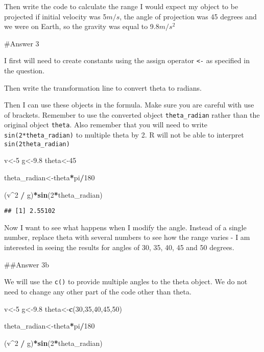 \documentclass[
]{article}
\newenvironment{Shaded}{\begin{snugshade}}{\end{snugshade}}
\newcommand{\DecValTok}[1]{\textcolor[rgb]{0.00,0.00,0.81}{#1}}
\newcommand{\FloatTok}[1]{\textcolor[rgb]{0.00,0.00,0.81}{#1}}
\newcommand{\KeywordTok}[1]{\textcolor[rgb]{0.13,0.29,0.53}{\textbf{#1}}}
\newcommand{\NormalTok}[1]{#1}
\newcommand{\OperatorTok}[1]{\textcolor[rgb]{0.81,0.36,0.00}{\textbf{#1}}}
\newcommand{\StringTok}[1]{\textcolor[rgb]{0.31,0.60,0.02}{#1}}
\begin{document}
Then write the code to calculate the range I would expect my object to
be projected if initial velocity was 5\(m/s\), the angle of projection
was 45 degrees and we were on Earth, so the gravity was equal to
9.8\(m/s^2\)

\#Answer 3

I first will need to create constants using the assign operator
\texttt{\textless{}-} as specified in the question.

Then write the transformation line to convert theta to radians.

Then I can use these objects in the formula. Make sure you are careful
with use of brackets. Remember to use the converted object
\texttt{theta\_radian} rather than the original object \texttt{theta}.
Also remember that you will need to write \texttt{sin(2*theta\_radian)}
to multiple theta by 2. R will not be able to interpret
\texttt{sin(2theta\_radian)}

\begin{Shaded}
\begin{Highlighting}[]
\NormalTok{v<-}\DecValTok{5}
\NormalTok{g<-}\FloatTok{9.8}
\NormalTok{theta<-}\DecValTok{45}

\NormalTok{theta_radian<-theta}\OperatorTok{*}\NormalTok{pi}\OperatorTok{/}\DecValTok{180}


\NormalTok{(v}\OperatorTok{^}\DecValTok{2} \OperatorTok{/}\StringTok{ }\NormalTok{g)}\OperatorTok{*}\KeywordTok{sin}\NormalTok{(}\DecValTok{2}\OperatorTok{*}\NormalTok{theta_radian)}
\end{Highlighting}
\end{Shaded}

\begin{verbatim}
## [1] 2.55102
\end{verbatim}

Now I want to see what happens when I modify the angle. Instead of a
single number, replace theta with several numbers to see how the range
varies - I am interested in seeing the results for angles of 30, 35, 40,
45 and 50 degrees.

\#\#Answer 3b

We will use the \texttt{c()} to provide multiple angles to the theta
object. We do not need to change any other part of the code other than
theta.

\begin{Shaded}
\begin{Highlighting}[]
\NormalTok{v<-}\DecValTok{5}
\NormalTok{g<-}\FloatTok{9.8}
\NormalTok{theta<-}\KeywordTok{c}\NormalTok{(}\DecValTok{30}\NormalTok{,}\DecValTok{35}\NormalTok{,}\DecValTok{40}\NormalTok{,}\DecValTok{45}\NormalTok{,}\DecValTok{50}\NormalTok{)}

\NormalTok{theta_radian<-theta}\OperatorTok{*}\NormalTok{pi}\OperatorTok{/}\DecValTok{180}


\NormalTok{(v}\OperatorTok{^}\DecValTok{2} \OperatorTok{/}\StringTok{ }\NormalTok{g)}\OperatorTok{*}\KeywordTok{sin}\NormalTok{(}\DecValTok{2}\OperatorTok{*}\NormalTok{theta_radian)}
\end{Highlighting}
\end{Shaded}
\end{document}
